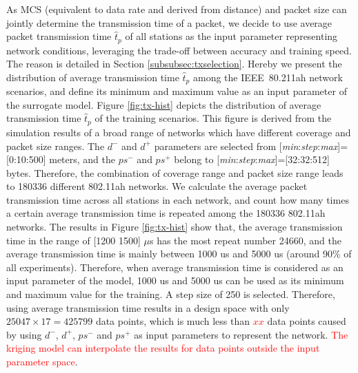 



As MCS (equivalent to data rate and derived from distance) and packet size can jointly determine the transmission time of a packet, we decide to use average packet transmission time $\hat{t}_p$ of all stations as the input parameter representing network conditions, leveraging the trade-off between accuracy and training speed. %
The reason is detailed in Section \ref{subsubsec:txselection}. Hereby we present the distribution of average transmission time $\hat{t}_p$ among the IEEE~80.211ah network scenarios, and define its minimum and maximum value as an input parameter of the surrogate model. Figure \ref{fig:tx-hist} depicts the 
distribution of average transmission time $\hat{t}_p$ of the training scenarios.  This figure is derived from the simulation results of a broad range of networks which have different coverage and packet size ranges. The $d^-$ and $d^+$ parameters are selected from [\textit{min}:\textit{step}:\textit{max}]=[0:10:500] meters, and the $ps^-$ and $ps^+$ belong to  [\textit{min}:\textit{step}:\textit{max}]=[32:32:512] bytes. Therefore, the combination of coverage range and packet size range  leads to 180336 different 802.11ah networks. We calculate the average packet transmission time across all stations in each network, and count how many times a certain average transmission time is repeated among the 180336 802.11ah networks.
 The results in Figure \ref{fig:tx-hist} show that, the average transmission time in the range of [1200 1500] $\mu$s has the most repeat number 24660,  and the average transmission time is mainly between 1000 us and 5000 us (around 90\% of all experiments). Therefore,  when average transmission time is considered as an input parameter of the model, 1000 us and 5000 us can be used as its minimum and maximum value for the training. A step size of 250 is selected. Therefore, using average transmission time results in a design space with only $25047 \times 17 = 425799$ data points, which is much less than  \textcolor{red}{$xx$} data points caused by using $d^-$, $d^+$, $ps^-$ and $ps^+$ as input parameters to represent the network. \textcolor{red}{The kriging model can interpolate the results for data points outside the input parameter space}.
 
